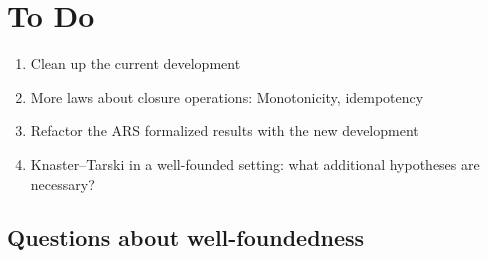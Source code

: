 \documentclass{scrartcl}
\begin{document}
\section{To Do}
\begin{enumerate}
  \item Clean up the current development
  \item More laws about closure operations: Monotonicity, idempotency
  \item Refactor the ARS formalized results with the new development
  \item Knaster--Tarski in a well-founded setting: what additional
  hypotheses are necessary?
\end{enumerate}

\subsection{Questions about well-foundedness}
\end{document}
